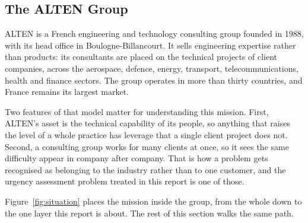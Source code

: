 \subsection{The ALTEN Group}
\label{sec:alten}

ALTEN is a French engineering and technology consulting group founded in 1988, with its
head office in Boulogne-Billancourt. It sells engineering expertise rather than products:
its consultants are placed on the technical projects of client companies, across the
aerospace, defence, energy, transport, telecommunications, health and finance sectors. The
group operates in more than thirty countries, and France remains its largest market.

Two features of that model matter for understanding this mission. First, ALTEN's asset is the
technical capability of its people, so anything that raises the level of a whole practice has
leverage that a single client project does not. Second, a consulting group works for many
clients at once, so it sees the same difficulty appear in company after company. That is how
a problem gets recognised as belonging to the industry rather than to one customer, and the
urgency assessment problem treated in this report is one of those.

Figure~\ref{fig:situation} places the mission inside the group, from the whole down to the
one layer this report is about. The rest of this section walks the same path.

